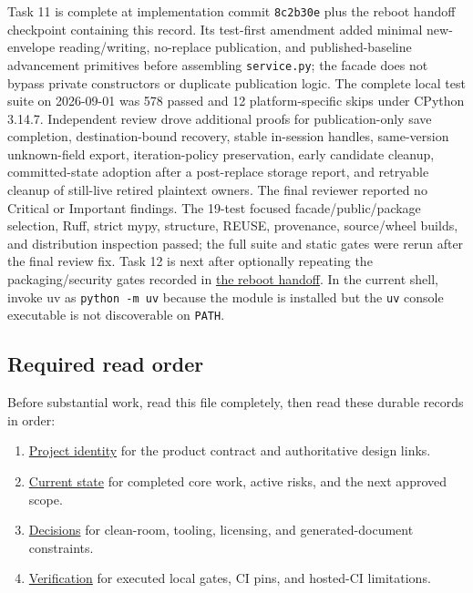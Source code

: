 \documentclass[
  letterpaper,
]{article}
\newcommand{\passthrough}[1]{#1}
\providecommand{\tightlist}{%
  \setlength{\itemsep}{0pt}\setlength{\parskip}{0pt}}
\begin{document}
Task 11 is complete at implementation commit \passthrough{\lstinline!8c2b30e!} plus the reboot handoff checkpoint
containing this record. Its test-first amendment added minimal new-envelope reading/writing, no-replace publication, and
published-baseline advancement primitives before assembling \nolinkurl{service.py}; the facade does not bypass private
constructors or duplicate publication logic. The complete local test suite on 2026-09-01 was 578 passed and 12
platform-specific skips under CPython 3.14.7. Independent review drove additional proofs for publication-only save
completion, destination-bound recovery, stable in-session handles, same-version unknown-field export, iteration-policy
preservation, early candidate cleanup, committed-state adoption after a post-replace storage report, and retryable
cleanup of still-live retired plaintext owners. The final reviewer reported no Critical or Important findings. The
19-test focused facade/public/package selection, Ruff, strict mypy, structure, REUSE, provenance, source/wheel builds,
and distribution inspection passed; the full suite and static gates were rerun after the final review fix. Task 12 is
next after optionally repeating the packaging/security gates recorded in \href{HANDOFF.md}{the reboot handoff}. In the
current shell, invoke uv as \passthrough{\lstinline!python -m uv!} because the module is installed but the
\passthrough{\lstinline!uv!} console executable is not discoverable on \passthrough{\lstinline!PATH!}.

\subsection{Required read order}\label{required-read-order}

Before substantial work, read this file completely, then read these durable records in order:

\begin{enumerate}
\def\labelenumi{\arabic{enumi}.}
\tightlist
\item
  \href{project-memory/PROJECT.md}{Project identity} for the product contract and authoritative design links.
\item
  \href{project-memory/STATE.md}{Current state} for completed core work, active risks, and the next approved scope.
\item
  \href{project-memory/DECISIONS.md}{Decisions} for clean-room, tooling, licensing, and generated-document constraints.
\item
  \href{project-memory/VERIFICATION.md}{Verification} for executed local gates, CI pins, and hosted-CI limitations.
\end{enumerate}
\end{document}
